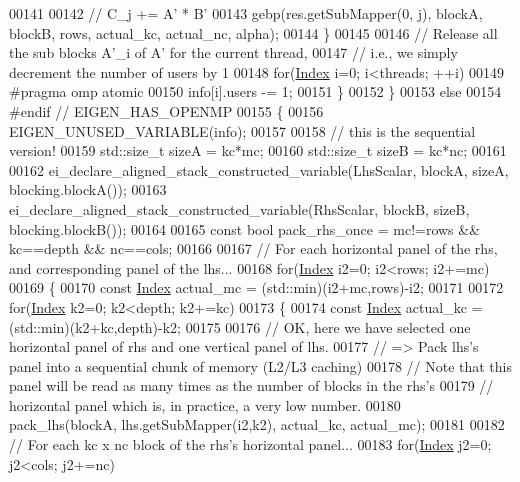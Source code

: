 \begin{DoxyCode}
00141 
00142         \textcolor{comment}{// C\_j += A' * B'}
00143         gebp(res.getSubMapper(0, j), blockA, blockB, rows, actual\_kc, actual\_nc, alpha);
00144       \}
00145 
00146       \textcolor{comment}{// Release all the sub blocks A'\_i of A' for the current thread,}
00147       \textcolor{comment}{// i.e., we simply decrement the number of users by 1}
00148       \textcolor{keywordflow}{for}(\hyperlink{namespace_eigen_a62e77e0933482dafde8fe197d9a2cfde}{Index} i=0; i<threads; ++i)
00149         #pragma omp atomic
00150         info[i].users -= 1;
00151     \}
00152   \}
00153   \textcolor{keywordflow}{else}
00154 \textcolor{preprocessor}{#endif // EIGEN\_HAS\_OPENMP}
00155   \{
00156     EIGEN\_UNUSED\_VARIABLE(info);
00157 
00158     \textcolor{comment}{// this is the sequential version!}
00159     std::size\_t sizeA = kc*mc;
00160     std::size\_t sizeB = kc*nc;
00161 
00162     ei\_declare\_aligned\_stack\_constructed\_variable(LhsScalar, blockA, sizeA, blocking.blockA());
00163     ei\_declare\_aligned\_stack\_constructed\_variable(RhsScalar, blockB, sizeB, blocking.blockB());
00164 
00165     \textcolor{keyword}{const} \textcolor{keywordtype}{bool} pack\_rhs\_once = mc!=rows && kc==depth && nc==cols;
00166 
00167     \textcolor{comment}{// For each horizontal panel of the rhs, and corresponding panel of the lhs...}
00168     \textcolor{keywordflow}{for}(\hyperlink{namespace_eigen_a62e77e0933482dafde8fe197d9a2cfde}{Index} i2=0; i2<rows; i2+=mc)
00169     \{
00170       \textcolor{keyword}{const} \hyperlink{namespace_eigen_a62e77e0933482dafde8fe197d9a2cfde}{Index} actual\_mc = (std::min)(i2+mc,rows)-i2;
00171 
00172       \textcolor{keywordflow}{for}(\hyperlink{namespace_eigen_a62e77e0933482dafde8fe197d9a2cfde}{Index} k2=0; k2<depth; k2+=kc)
00173       \{
00174         \textcolor{keyword}{const} \hyperlink{namespace_eigen_a62e77e0933482dafde8fe197d9a2cfde}{Index} actual\_kc = (std::min)(k2+kc,depth)-k2;
00175 
00176         \textcolor{comment}{// OK, here we have selected one horizontal panel of rhs and one vertical panel of lhs.}
00177         \textcolor{comment}{// => Pack lhs's panel into a sequential chunk of memory (L2/L3 caching)}
00178         \textcolor{comment}{// Note that this panel will be read as many times as the number of blocks in the rhs's}
00179         \textcolor{comment}{// horizontal panel which is, in practice, a very low number.}
00180         pack\_lhs(blockA, lhs.getSubMapper(i2,k2), actual\_kc, actual\_mc);
00181 
00182         \textcolor{comment}{// For each kc x nc block of the rhs's horizontal panel...}
00183         \textcolor{keywordflow}{for}(\hyperlink{namespace_eigen_a62e77e0933482dafde8fe197d9a2cfde}{Index} j2=0; j2<cols; j2+=nc)

\end{DoxyCode}

